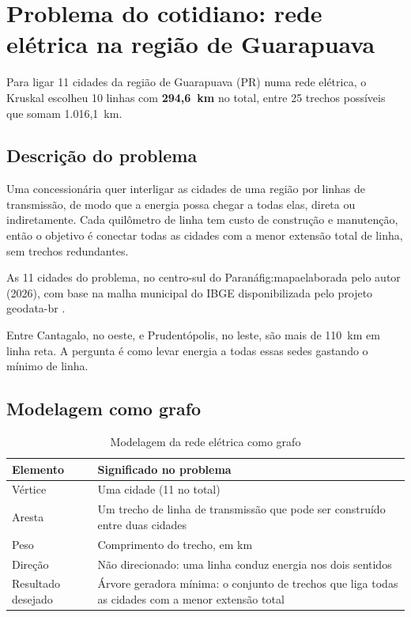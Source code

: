 \documentclass[a4paper]{article}
\newcommand{\fonte}[1]{\par\smallskip{\centering\footnotesize Fonte: #1\par}}
\begin{document}
\section{Problema do cotidiano: rede elétrica na região de Guarapuava}\label{sec:rede}
Para ligar 11 cidades da região de Guarapuava (PR) numa rede elétrica, o Kruskal
escolheu 10 linhas com \textbf{294,6~km} no total, entre 25 trechos possíveis que
somam 1.016,1~km.

\subsection{Descrição do problema}

Uma concessionária quer interligar as cidades de uma região por linhas de
transmissão, de modo que a energia possa chegar a todas elas, direta ou
indiretamente. Cada quilômetro de linha tem custo de construção e manutenção,
então o objetivo é conectar todas as cidades com a menor extensão total de
linha, sem trechos redundantes.

\begin{figura}{As 11 cidades do problema, no centro-sul do Paraná}{fig:mapa}{elaborada pelo autor (2026), com base na malha municipal do IBGE disponibilizada pelo projeto geodata-br \cite{geodatabr}.}
\resizebox{\textwidth}{!}{}
\par{}
\end{figura}

Entre Cantagalo, no oeste, e Prudentópolis, no leste, são mais de 110~km em linha
reta. A pergunta é como levar energia a todas essas sedes gastando o mínimo de
linha.

\subsection{Modelagem como grafo}

\begin{table}[H]
\centering
\caption{Modelagem da rede elétrica como grafo}\label{tab:modelo-rede}
\begin{tabularx}{\textwidth}{l >{\raggedright\arraybackslash}X}
\toprule
Elemento & Significado no problema \\
\midrule
Vértice & Uma cidade (11 no total) \\
Aresta & Um trecho de linha de transmissão que pode ser construído entre duas cidades \\
Peso & Comprimento do trecho, em km \\
Direção & Não direcionado: uma linha conduz energia nos dois sentidos \\
Resultado desejado & Árvore geradora mínima: o conjunto de trechos que liga todas as cidades com a menor extensão total \\
\bottomrule
\end{tabularx}
\fonte{elaborada pelo autor (2026).}
\end{table}
\end{document}
